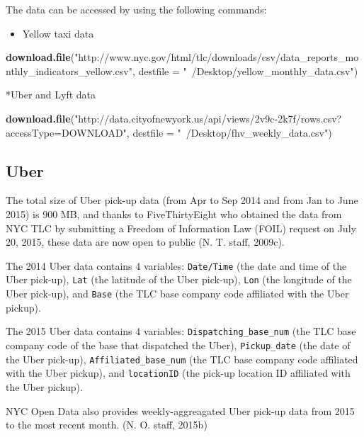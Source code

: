 \documentclass[12pt,twoside]{reedthesis}
\newenvironment{Shaded}{\begin{snugshade}}{\end{snugshade}}
\newcommand{\KeywordTok}[1]{\textcolor[rgb]{0.13,0.29,0.53}{\textbf{#1}}}
\newcommand{\DataTypeTok}[1]{\textcolor[rgb]{0.13,0.29,0.53}{#1}}
\newcommand{\StringTok}[1]{\textcolor[rgb]{0.31,0.60,0.02}{#1}}
\newcommand{\NormalTok}[1]{#1}
\providecommand{\tightlist}{%
  \setlength{\itemsep}{0pt}\setlength{\parskip}{0pt}}
\theoremstyle{definition}
\theoremstyle{definition}
\theoremstyle{definition}
\theoremstyle{remark}
\begin{document}
The data can be accessed by using the following commands:
\begin{itemize}
\tightlist
\item
  Yellow taxi data
\end{itemize}
\begin{Shaded}
\begin{Highlighting}[]
\KeywordTok{download.file}\NormalTok{(}\StringTok{"http://www.nyc.gov/html/tlc/downloads/csv/data_reports_monthly_indicators_yellow.csv"}\NormalTok{, }\DataTypeTok{destfile =} \StringTok{"~/Desktop/yellow_monthly_data.csv"}\NormalTok{)}
\end{Highlighting}
\end{Shaded}
*Uber and Lyft data
\begin{Shaded}
\begin{Highlighting}[]
\KeywordTok{download.file}\NormalTok{(}\StringTok{"http://data.cityofnewyork.us/api/views/2v9c-2k7f/rows.csv?accessType=DOWNLOAD"}\NormalTok{, }\DataTypeTok{destfile =} \StringTok{"~/Desktop/fhv_weekly_data.csv"}\NormalTok{)}
\end{Highlighting}
\end{Shaded}
\subsection{Uber}\label{uber-1}

The total size of Uber pick-up data (from Apr to Sep 2014 and from Jan
to June 2015) is 900 MB, and thanks to FiveThirtyEight who obtained the
data from NYC TLC by submitting a Freedom of Information Law (FOIL)
request on July 20, 2015, these data are now open to public (N. T.
staff, 2009c).

The 2014 Uber data contains 4 variables: \texttt{Date/Time} (the date
and time of the Uber pick-up), \texttt{Lat} (the latitude of the Uber
pick-up), \texttt{Lon} (the longitude of the Uber pick-up), and
\texttt{Base} (the TLC base company code affiliated with the Uber
pickup).

The 2015 Uber data contains 4 variables: \texttt{Dispatching\_base\_num}
(the TLC base company code of the base that dispatched the Uber),
\texttt{Pickup\_date} (the date of the Uber pick-up),
\texttt{Affiliated\_base\_num} (the TLC base company code affiliated
with the Uber pickup), and \texttt{locationID} (the pick-up location ID
affiliated with the Uber pickup).

NYC Open Data also provides weekly-aggreagated Uber pick-up data from
2015 to the most recent month. (N. O. staff, 2015b)
\end{document}
